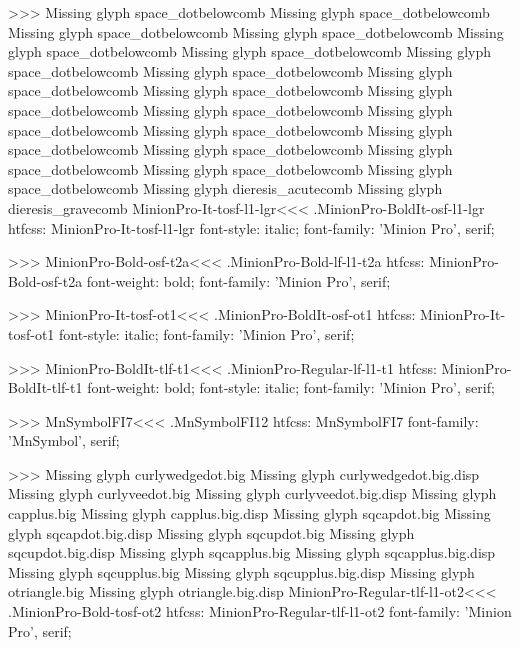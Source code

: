 {>>>
Missing glyph	space_dotbelowcomb
Missing glyph	space_dotbelowcomb
Missing glyph	space_dotbelowcomb
Missing glyph	space_dotbelowcomb
Missing glyph	space_dotbelowcomb
Missing glyph	space_dotbelowcomb
Missing glyph	space_dotbelowcomb
Missing glyph	space_dotbelowcomb
Missing glyph	space_dotbelowcomb
Missing glyph	space_dotbelowcomb
Missing glyph	space_dotbelowcomb
Missing glyph	space_dotbelowcomb
Missing glyph	space_dotbelowcomb
Missing glyph	space_dotbelowcomb
Missing glyph	space_dotbelowcomb
Missing glyph	space_dotbelowcomb
Missing glyph	space_dotbelowcomb
Missing glyph	space_dotbelowcomb
Missing glyph	space_dotbelowcomb
Missing glyph	dieresis_acutecomb
Missing glyph	dieresis_gravecomb
\<MinionPro-It-tosf-l1-lgr\><<<
.MinionPro-BoldIt-osf-l1-lgr
htfcss:  MinionPro-It-tosf-l1-lgr  font-style: italic; font-family: 'Minion Pro', serif;

>>>
\<MinionPro-Bold-osf-t2a\><<<
.MinionPro-Bold-lf-l1-t2a
htfcss:  MinionPro-Bold-osf-t2a  font-weight: bold; font-family: 'Minion Pro', serif;

>>>
\<MinionPro-It-tosf-ot1\><<<
.MinionPro-BoldIt-osf-ot1
htfcss:  MinionPro-It-tosf-ot1  font-style: italic; font-family: 'Minion Pro', serif;

>>>
\<MinionPro-BoldIt-tlf-t1\><<<
.MinionPro-Regular-lf-l1-t1
htfcss:  MinionPro-BoldIt-tlf-t1  font-weight: bold; font-style: italic; font-family: 'Minion Pro', serif;

>>>
\<MnSymbolFI7\><<<
.MnSymbolFI12
htfcss:  MnSymbolFI7  font-family: 'MnSymbol', serif;

>>>
Missing glyph	curlywedgedot.big
Missing glyph	curlywedgedot.big.disp
Missing glyph	curlyveedot.big
Missing glyph	curlyveedot.big.disp
Missing glyph	capplus.big
Missing glyph	capplus.big.disp
Missing glyph	sqcapdot.big
Missing glyph	sqcapdot.big.disp
Missing glyph	sqcupdot.big
Missing glyph	sqcupdot.big.disp
Missing glyph	sqcapplus.big
Missing glyph	sqcapplus.big.disp
Missing glyph	sqcupplus.big
Missing glyph	sqcupplus.big.disp
Missing glyph	otriangle.big
Missing glyph	otriangle.big.disp
\<MinionPro-Regular-tlf-l1-ot2\><<<
.MinionPro-Bold-tosf-ot2
htfcss:  MinionPro-Regular-tlf-l1-ot2  font-family: 'Minion Pro', serif;

}
